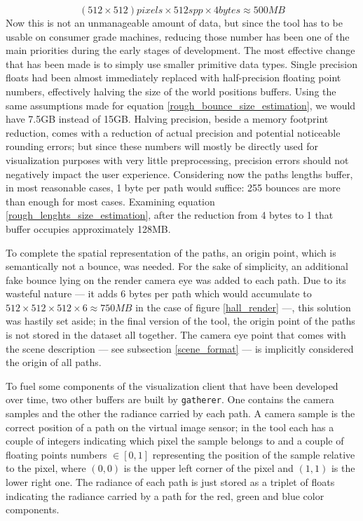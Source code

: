 \begin{equation}
	\label{rough_lenghts_size_estimation}
	(512 \times 512) pixels \times 512 spp \times 4 bytes \approx 500MB
\end{equation}
Now this is not an unmanageable amount of data, but since the tool has to be usable on consumer grade machines, reducing those number has been one of the main priorities during the early stages of development. The most effective change that has been made is to simply use smaller primitive data types. 
Single precision floats had been almost immediately replaced with half-precision floating point numbers, effectively halving the size of the world positions buffers. Using the same assumptions made for equation \ref{rough_bounce_size_estimation}, we would have 7.5GB instead of 15GB.
Halving precision, beside a memory footprint reduction, comes with a reduction of actual precision and potential noticeable rounding errors; but since these numbers will mostly be directly used for visualization purposes with very little preprocessing, precision errors should not negatively impact the user experience.
Considering now the paths lengths buffer, in most reasonable cases, 1 byte per path would suffice: 255 bounces are more than enough for most cases. Examining equation \ref{rough_lenghts_size_estimation}, after the reduction from 4 bytes to 1 that buffer occupies approximately 128MB.

To complete the spatial representation of the paths, an origin point, which is semantically not a bounce, was needed. For the sake of simplicity, an additional fake bounce lying on the render camera eye was added to each path. Due to its wasteful nature --- it adds 6 bytes per path which would accumulate to $512\times 512\times 512\times 6\approx 750MB$ in the case of figure \ref{hall_render} ---, this solution was hastily set aside; in the final version of the tool, the origin point of the paths is not stored in the dataset all together. The camera eye point that comes with the scene description --- see subsection \ref{scene_format} --- is implicitly considered the origin of all paths.

To fuel some components of the visualization client that have been developed over time, two other buffers are built by \texttt{gatherer}. One contains the camera samples and the other the radiance carried by each path. A camera sample is the correct position of a path on the virtual image sensor; in the tool each has a couple of integers indicating which pixel the sample belongs to and a couple of floating points numbers $\in [0, 1]$ representing the position of the sample relative to the pixel, where $(0,0)$ is the upper left corner of the pixel and $(1,1)$ is the lower right one. The radiance of each path is just stored as a triplet of floats indicating the radiance carried by a path for the red, green and blue color components.


